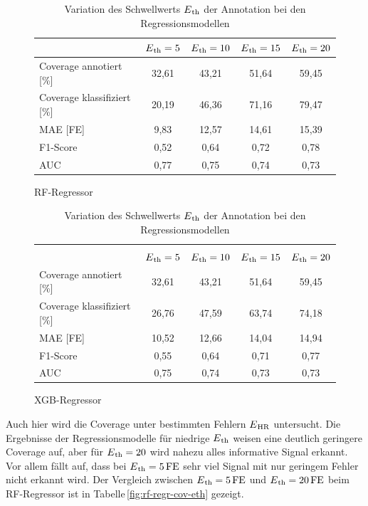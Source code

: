 \begin{table}[H]
	\begin{subfigure}{\textwidth}
	\centering
	\begin{tabular}{l || c | c | c | c}
								& $E\textsubscript{th}=5$	& $E\textsubscript{th}=10$	& $E\textsubscript{th}=15$	& $E\textsubscript{th}=20$	\\ \hline
	Coverage annotiert [\%]		& 32,61						& 43{,}21 					& 51,64						& 59,45\\
 	Coverage klassifiziert [\%]	& 20,19						& 46,36 					& 71,16						& 79,47\\
 	\ac{MAE} [FE]				& 9,83						& 12,57						& 14,61						& 15,39\\
 	F1-Score 					& 0,52						& 0,64						& 0,72						& 0,78\\
 	AUC 						& 0,77						& 0,75						& 0,74						& 0,73\\
 	\end{tabular}	
	\caption{\ac{RF}-Regressor}
	\end{subfigure}
 	\begin{subfigure}{\textwidth}
	\centering
	\begin{tabular}{l || c | c | c | c}
	\multicolumn{5}{l}{	}	\\
								& $E\textsubscript{th}=5$	& $E\textsubscript{th}=10$	& $E\textsubscript{th}=15$	& $E\textsubscript{th}=20$	\\ \hline
	Coverage annotiert [\%]		& 32,61						& 43{,}21 					& 51,64						& 59,45\\
 	Coverage klassifiziert [\%]	& 26,76						& 47,59 					& 63,74						& 74,18\\
 	\ac{MAE} [FE]				& 10,52						& 12,66						& 14,04						& 14,94\\
 	F1-Score 					& 0,55						& 0,64						& 0,71						& 0,77\\
 	AUC 						& 0,75						& 0,74						& 0,73						& 0,73\\
 	\end{tabular}	
	\caption{\ac{XGB}-Regressor}
	\end{subfigure}
	\caption{Variation des Schwellwerts $E\textsubscript{th}$ der Annotation bei den Regressionsmodellen}
	\label{fig:var-eth-regr}
\end{table}

Auch hier wird die Coverage unter bestimmten Fehlern $E\textsubscript{HR}$ untersucht. Die Ergebnisse der Regressionsmodelle für niedrige $E\textsubscript{th}$ weisen eine deutlich geringere Coverage auf, aber für $E\textsubscript{th} = 20$ wird nahezu alles informative Signal erkannt. Vor allem fällt auf, dass bei $E\textsubscript{th}= 5\text{\,}\si{FE}$ sehr viel Signal mit nur geringem Fehler nicht erkannt wird. Der Vergleich zwischen $E\textsubscript{th}= 5\text{\,}\si{FE}$ und $E\textsubscript{th}= 20\text{\,}\si{FE}$ beim \ac{RF}-Regressor ist in Tabelle\,\ref{fig:rf-regr-cov-eth} gezeigt.

